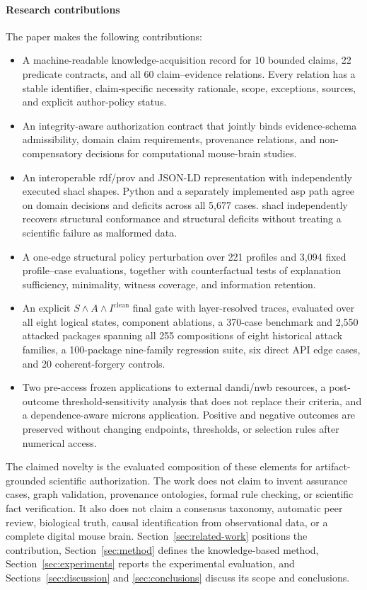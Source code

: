 \paragraph{Research contributions}\label{sec:contributions}
The paper makes the following contributions:
\begin{itemize}
\item A machine-readable knowledge-acquisition record for 10 bounded claims, 22 predicate contracts, and all 60 claim--evidence relations. Every relation has a stable identifier, claim-specific necessity rationale, scope, exceptions, sources, and explicit author-policy status.
\item An integrity-aware authorization contract that jointly binds evidence-schema admissibility, domain claim requirements, provenance relations, and non-compensatory decisions for computational mouse-brain studies.
\item An interoperable \ac{rdf}/\ac{prov} and JSON-LD representation with independently executed \ac{shacl} shapes. Python and a separately implemented \ac{asp} path agree on domain decisions and deficits across all 5,677 cases. \ac{shacl} independently recovers structural conformance and structural deficits without treating a scientific failure as malformed data.
\item A one-edge structural policy perturbation over 221 profiles and 3,094 fixed profile--case evaluations, together with counterfactual tests of explanation sufficiency, minimality, witness coverage, and information retention.
\item An explicit $S\land A\land I^{\mathrm{clean}}$ final gate with layer-resolved traces, evaluated over all eight logical states, component ablations, a 370-case benchmark and 2,550 attacked packages spanning all 255 compositions of eight historical attack families, a 100-package nine-family regression suite, six direct API edge cases, and 20 coherent-forgery controls.
\item Two pre-access frozen applications to external \ac{dandi}/\ac{nwb} resources, a post-outcome threshold-sensitivity analysis that does not replace their criteria, and a dependence-aware \ac{microns} application. Positive and negative outcomes are preserved without changing endpoints, thresholds, or selection rules after numerical access.
\end{itemize}

The claimed novelty is the evaluated composition of these elements for artifact-grounded scientific authorization. The work does not claim to invent assurance cases, graph validation, provenance ontologies, formal rule checking, or scientific fact verification. It also does not claim a consensus taxonomy, automatic peer review, biological truth, causal identification from observational data, or a complete digital mouse brain. Section~\ref{sec:related-work} positions the contribution, Section~\ref{sec:method} defines the knowledge-based method, Section~\ref{sec:experiments} reports the experimental evaluation, and Sections~\ref{sec:discussion} and \ref{sec:conclusions} discuss its scope and conclusions.
